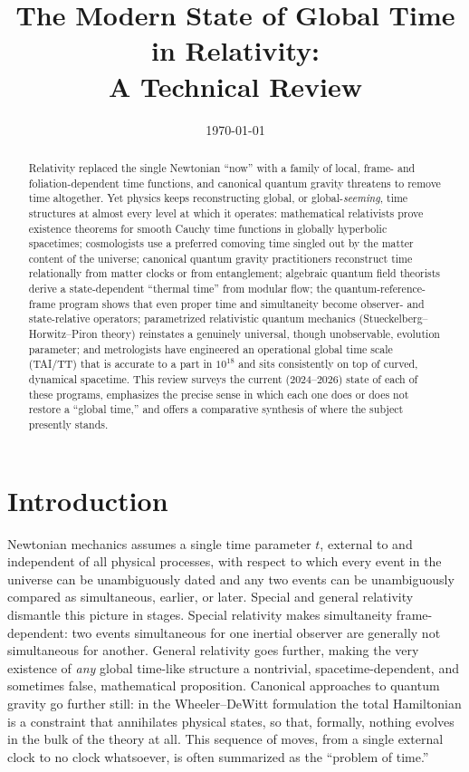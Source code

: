 \documentclass[11pt]{article}
\title{\bfseries The Modern State of Global Time in Relativity:\\[2pt] \large A Technical Review}
\author{}
\date{\today}
\begin{document}
\maketitle

\begin{abstract}
\noindent
Relativity replaced the single Newtonian ``now'' with a family of local, frame- and foliation-dependent time functions, and canonical quantum gravity threatens to remove time altogether. Yet physics keeps reconstructing global, or global-\emph{seeming}, time structures at almost every level at which it operates: mathematical relativists prove existence theorems for smooth Cauchy time functions in globally hyperbolic spacetimes; cosmologists use a preferred comoving time singled out by the matter content of the universe; canonical quantum gravity practitioners reconstruct time relationally from matter clocks or from entanglement; algebraic quantum field theorists derive a state-dependent ``thermal time'' from modular flow; the quantum-reference-frame program shows that even proper time and simultaneity become observer- and state-relative operators; parametrized relativistic quantum mechanics (Stueckelberg--Horwitz--Piron theory) reinstates a genuinely universal, though unobservable, evolution parameter; and metrologists have engineered an operational global time scale (TAI/TT) that is accurate to a part in $10^{18}$ and sits consistently on top of curved, dynamical spacetime. This review surveys the current (2024--2026) state of each of these programs, emphasizes the precise sense in which each one does or does not restore a ``global time,'' and offers a comparative synthesis of where the subject presently stands.
\end{abstract}

\tableofcontents

\section{Introduction}

Newtonian mechanics assumes a single time parameter $t$, external to and independent of all physical processes, with respect to which every event in the universe can be unambiguously dated and any two events can be unambiguously compared as simultaneous, earlier, or later. Special and general relativity dismantle this picture in stages. Special relativity makes simultaneity frame-dependent: two events simultaneous for one inertial observer are generally not simultaneous for another. General relativity goes further, making the very existence of \emph{any} global time-like structure a nontrivial, spacetime-dependent, and sometimes false, mathematical proposition. Canonical approaches to quantum gravity go further still: in the Wheeler--DeWitt formulation the total Hamiltonian is a constraint that annihilates physical states, so that, formally, nothing evolves in the bulk of the theory at all. This sequence of moves, from a single external clock to no clock whatsoever, is often summarized as the ``problem of time.''
\end{document}
